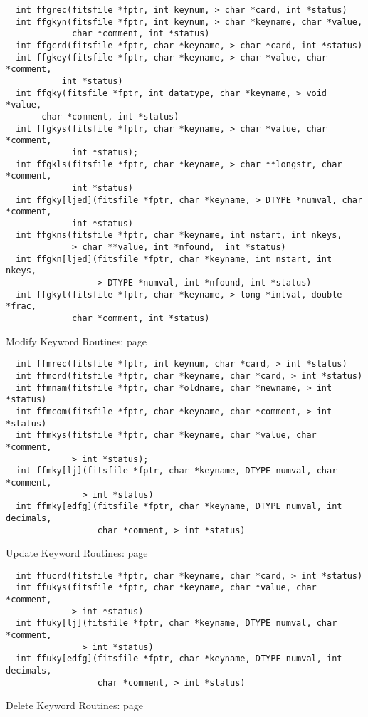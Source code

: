 \begin{verbatim}
  int ffgrec(fitsfile *fptr, int keynum, > char *card, int *status)
  int ffgkyn(fitsfile *fptr, int keynum, > char *keyname, char *value,
             char *comment, int *status)
  int ffgcrd(fitsfile *fptr, char *keyname, > char *card, int *status)
  int ffgkey(fitsfile *fptr, char *keyname, > char *value, char *comment,
           int *status)
  int ffgky(fitsfile *fptr, int datatype, char *keyname, > void *value,
       char *comment, int *status)
  int ffgkys(fitsfile *fptr, char *keyname, > char *value, char *comment,
             int *status);
  int ffgkls(fitsfile *fptr, char *keyname, > char **longstr, char *comment,
             int *status)
  int ffgky[ljed](fitsfile *fptr, char *keyname, > DTYPE *numval, char *comment,
             int *status)
  int ffgkns(fitsfile *fptr, char *keyname, int nstart, int nkeys,
             > char **value, int *nfound,  int *status)
  int ffgkn[ljed](fitsfile *fptr, char *keyname, int nstart, int nkeys,
                  > DTYPE *numval, int *nfound, int *status)
  int ffgkyt(fitsfile *fptr, char *keyname, > long *intval, double *frac,
             char *comment, int *status)
\end{verbatim}
 Modify Keyword Routines: page~\pageref{FFMREC}

\begin{verbatim}
  int ffmrec(fitsfile *fptr, int keynum, char *card, > int *status)
  int ffmcrd(fitsfile *fptr, char *keyname, char *card, > int *status)
  int ffmnam(fitsfile *fptr, char *oldname, char *newname, > int *status)
  int ffmcom(fitsfile *fptr, char *keyname, char *comment, > int *status)
  int ffmkys(fitsfile *fptr, char *keyname, char *value, char *comment,
             > int *status);
  int ffmky[lj](fitsfile *fptr, char *keyname, DTYPE numval, char *comment,
               > int *status)
  int ffmky[edfg](fitsfile *fptr, char *keyname, DTYPE numval, int decimals,
                  char *comment, > int *status)
\end{verbatim}
 Update Keyword Routines: page~\pageref{FFUCRD}

\begin{verbatim}
  int ffucrd(fitsfile *fptr, char *keyname, char *card, > int *status)
  int ffukys(fitsfile *fptr, char *keyname, char *value, char *comment,
             > int *status)
  int ffuky[lj](fitsfile *fptr, char *keyname, DTYPE numval, char *comment,
               > int *status)
  int ffuky[edfg](fitsfile *fptr, char *keyname, DTYPE numval, int decimals,
                  char *comment, > int *status)
\end{verbatim}
 Delete Keyword Routines: page~\pageref{FFDREC}

